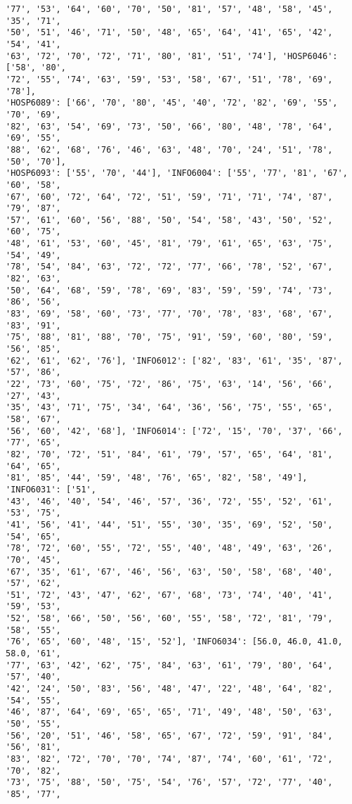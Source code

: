 \documentclass[11pt]{article}
\begin{document}
\begin{Verbatim}[commandchars=\\\{\}]
'77', '53', '64', '60', '70', '50', '81', '57', '48', '58', '45', '35', '71',
'50', '51', '46', '71', '50', '48', '65', '64', '41', '65', '42', '54', '41',
'63', '72', '70', '72', '71', '80', '81', '51', '74'], 'HOSP6046': ['58', '80',
'72', '55', '74', '63', '59', '53', '58', '67', '51', '78', '69', '78'],
'HOSP6089': ['66', '70', '80', '45', '40', '72', '82', '69', '55', '70', '69',
'82', '63', '54', '69', '73', '50', '66', '80', '48', '78', '64', '69', '55',
'88', '62', '68', '76', '46', '63', '48', '70', '24', '51', '78', '50', '70'],
'HOSP6093': ['55', '70', '44'], 'INFO6004': ['55', '77', '81', '67', '60', '58',
'67', '60', '72', '64', '72', '51', '59', '71', '71', '74', '87', '79', '87',
'57', '61', '60', '56', '88', '50', '54', '58', '43', '50', '52', '60', '75',
'48', '61', '53', '60', '45', '81', '79', '61', '65', '63', '75', '54', '49',
'78', '54', '84', '63', '72', '72', '77', '66', '78', '52', '67', '82', '63',
'50', '64', '68', '59', '78', '69', '83', '59', '59', '74', '73', '86', '56',
'83', '69', '58', '60', '73', '77', '70', '78', '83', '68', '67', '83', '91',
'75', '88', '81', '88', '70', '75', '91', '59', '60', '80', '59', '56', '85',
'62', '61', '62', '76'], 'INFO6012': ['82', '83', '61', '35', '87', '57', '86',
'22', '73', '60', '75', '72', '86', '75', '63', '14', '56', '66', '27', '43',
'35', '43', '71', '75', '34', '64', '36', '56', '75', '55', '65', '58', '67',
'56', '60', '42', '68'], 'INFO6014': ['72', '15', '70', '37', '66', '77', '65',
'82', '70', '72', '51', '84', '61', '79', '57', '65', '64', '81', '64', '65',
'81', '85', '44', '59', '48', '76', '65', '82', '58', '49'], 'INFO6031': ['51',
'43', '46', '40', '54', '46', '57', '36', '72', '55', '52', '61', '53', '75',
'41', '56', '41', '44', '51', '55', '30', '35', '69', '52', '50', '54', '65',
'78', '72', '60', '55', '72', '55', '40', '48', '49', '63', '26', '70', '45',
'67', '35', '61', '67', '46', '56', '63', '50', '58', '68', '40', '57', '62',
'51', '72', '43', '47', '62', '67', '68', '73', '74', '40', '41', '59', '53',
'52', '58', '66', '50', '56', '60', '55', '58', '72', '81', '79', '58', '55',
'76', '65', '60', '48', '15', '52'], 'INFO6034': [56.0, 46.0, 41.0, 58.0, '61',
'77', '63', '42', '62', '75', '84', '63', '61', '79', '80', '64', '57', '40',
'42', '24', '50', '83', '56', '48', '47', '22', '48', '64', '82', '54', '55',
'46', '87', '64', '69', '65', '65', '71', '49', '48', '50', '63', '50', '55',
'56', '20', '51', '46', '58', '65', '67', '72', '59', '91', '84', '56', '81',
'83', '82', '72', '70', '70', '74', '87', '74', '60', '61', '72', '70', '82',
'73', '75', '88', '50', '75', '54', '76', '57', '72', '77', '40', '85', '77',

\end{Verbatim}
\end{document}
